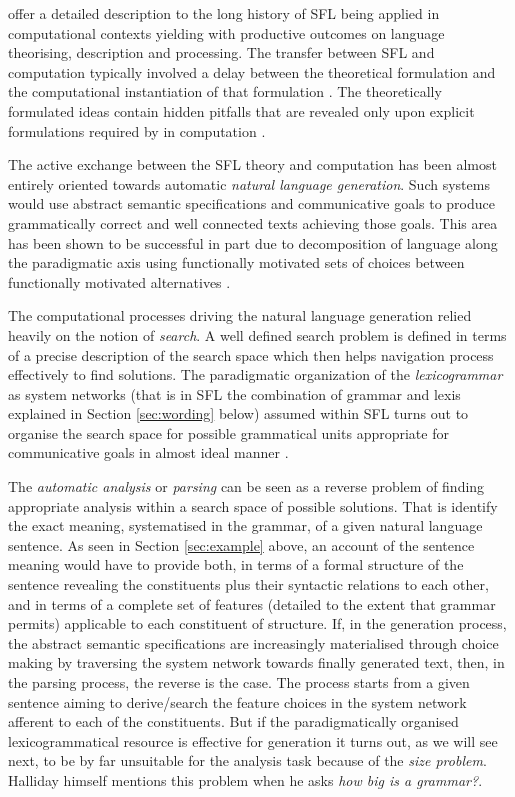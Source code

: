 \citet{ODonnell2005} offer a detailed description to the long history of SFL being applied in computational contexts yielding with productive outcomes on language theorising, description and processing. The transfer between SFL and computation typically involved a delay between the theoretical formulation and the computational instantiation of that formulation \citep[139]{BatemanMatthiessen88} \citep[19]{MatthiessenBateman91}. The theoretically formulated ideas contain hidden pitfalls that are revealed only upon explicit formulations required by in computation \citep[27]{Bateman2008}. 

The active exchange between the SFL theory and computation has been almost entirely oriented towards automatic \textit{natural language generation}. Such systems would use abstract semantic specifications and communicative goals to produce grammatically correct and well connected texts achieving those goals. This area has been shown to be successful in part due to decomposition of language along the paradigmatic axis using functionally motivated sets of choices between functionally motivated alternatives \citep{McDonald80}.

The computational processes driving the natural language generation relied heavily on the notion of \textit{search}. A well defined search problem is defined in terms of a precise description of the search space which then helps navigation process effectively to find solutions. The paradigmatic organization of the \textit{lexicogrammar} as system networks (that is in SFL the combination of grammar and lexis explained in Section \ref{sec:wording} below) assumed within SFL turns out to organise the search space for possible grammatical units appropriate for communicative goals in almost ideal manner \citep[28]{Bateman2008}.

The \textit{automatic analysis} or \textit{parsing} can be seen as a reverse problem of finding appropriate analysis within a search space of possible solutions. That is identify the exact meaning, systematised in the grammar, of a given natural language sentence. As seen in Section \ref{sec:example} above, an account of the sentence meaning would have to provide both, in terms of a formal structure of the sentence revealing the constituents plus their syntactic relations to each other, and in terms of a complete set of features (detailed to the extent that grammar permits) applicable to each constituent of structure. If, in the generation process, the abstract semantic specifications are increasingly materialised through choice making by traversing the system network towards finally generated text, then, in the parsing process, the reverse is the case. The process starts from a given sentence aiming to derive/search the feature choices in the system network afferent to each of the constituents. But if the paradigmatically organised lexicogrammatical resource is effective for generation it turns out, as we will see next, to be by far unsuitable for the analysis task because of the \textit{size problem}. Halliday himself mentions this problem when he asks \textit{how big is a grammar?}.

